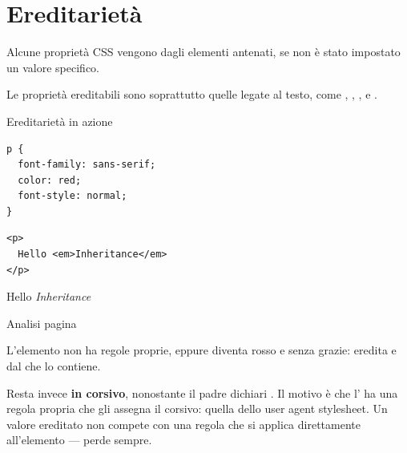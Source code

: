 \section{Ereditarietà}

Alcune proprietà CSS vengono  dagli elementi antenati, se non è
stato impostato un valore specifico.

Le proprietà ereditabili sono soprattutto quelle legate al testo, come
, , ,  e
.

\begin{esempio}{Ereditarietà in azione}
\begin{affianco}[0.46]
\begin{lstlisting}[style=css, name=eredita.css]
p {
  font-family: sans-serif;
  color: red;
  font-style: normal;
}
\end{lstlisting}
\begin{lstlisting}[style=html, name=eredita.html]
<p>
  Hello <em>Inheritance</em>
</p>
\end{lstlisting}
\risultato
\begin{browser}
  {\Lato\large\color{css-red}Hello \textit{Inheritance}}
\end{browser}
\begin{devtools}{Analisi pagina}
  \dtchiudi
  \dtchiudi
\end{devtools}
\end{affianco}

L'elemento  non ha regole proprie, eppure diventa rosso e senza grazie:
eredita  e  dal  che lo contiene.

Resta invece \textbf{in corsivo}, nonostante il padre dichiari
. Il motivo è che l' ha una regola propria che
gli assegna il corsivo: quella dello user agent stylesheet. Un valore ereditato
non compete con una regola che si applica direttamente all'elemento --- perde
sempre.
\end{esempio}


